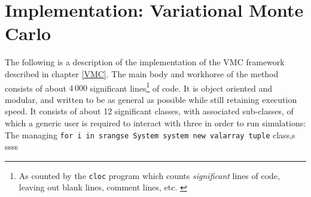 \documentclass[../../master.tex]{subfiles}
\begin{document}
\chapter{Implementation: Variational Monte Carlo}
The following is a description of the implementation of the VMC framework described in chapter \ref{VMC}. The main body and workhorse of the method consists of about $4\,000$ significant lines\footnote{As counted by the \lstinline{cloc} program which counts \emph{significant} lines of code, leaving out blank lines, comment lines, etc. \cite{cloc}} of \CC{}  code. It is object oriented and modular, and written to be as general as possible while still retaining execution speed. It consists of about 12 significant classes, with associated sub-classes, of which a generic user is required to interact with three in order to run simulations: The managing \lstinline[language={[std]c++}]{for i in srangse System system new valarray tuple} class,s ssss
\end{document}
